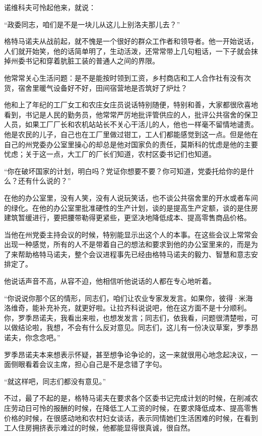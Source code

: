 诺维科夫可怜起他来，就说：

“政委同志，咱们是不是一块儿从这儿上别洛夫那儿去？”

格特马诺夫从战前起，就不愧是一个很好的群众工作者和领导者。他一开始说话，人们就开始笑，他的话简单明了，生动活泼，还常常带上几句粗话，一下子就会抹掉州委书记和穿着肮脏工装的普通人之间的界限。

他常常关心生活问题：是不是能按时领到工资，乡村商店和工人合作社有没有次货，宿舍里暖气设备好不好，田间宿营地是否筑好了炉灶？

他和上了年纪的工厂女工和农庄女庄员说话特别随便，特别和善，大家都很欣喜地看到，书记是人民的勤务员，他常常严厉地批评管供应的人，批评公共宿舍的保卫人员，如果工厂厂长和农机站站长不关心干活儿的人，他也一样毫不留情地谴责。他是农民的儿子，自己也在工厂里做过钳工，工人们都能感觉到这一点。但是他在自己的州党委办公室里操心的却总是他对国家负的责任，莫斯科的忧虑是他的主要忧虑；关于这一点，大工厂的厂长们知道，农村区委书记们也知道。

“你在破坏国家的计划，明白吗？党证你想要不要？你可知道，党委托给你的是什么？还有什么说的？”

在他的办公室里，没有人笑，没有人说玩笑话，也不谈公共宿舍里的开水或者车间的绿化。在他的办公室里批准硬性的生产计划，谈的是提高生产定额，谈的是住房建筑暂缓进行，要把腰带勒得更紧些，更坚决地降低成本、提高零售商品价格。

当他在州党委主持会议的时候，特别能显示出这个人的本事。在这些会议上常常会出现一种感觉，所有的人不是带着自己的想法和要求到他的办公室里来的，而是为了来帮助格特马诺夫，整个会议进程事先已经由格特马诺夫的毅力、智慧和意志安排定了。

他说话声音不高，从容不迫，他相信听他说话的人都在专心地听着。

“你说说你那个区的情形，同志们，咱们让农业专家发发言。如果你，彼得·米海洛维奇，能补充补充，就更好啦。让拉齐科说说吧，他在这方面不是十分顺利。你，罗季昂诺夫，我看出来啦，也想发发言；同志们，依我看，问题很清楚啦，可以做结论啦，我想，不会有什么反对意见。同志们，这儿有一份决议草案，罗季昂诺夫，你念念吧。”

罗季昂诺夫本来想表示怀疑，甚至想争论争论的，这一来就很用心地念起决议，一面侧眼看着会议主席，担心自己是不是念错了字句。

“就这样吧，同志们都没有意见。”

不过，最了不起的是，格特马诺夫在要求各个区委书记完成计划的时候，在削减农庄劳动日可怜的报酬的时候，在降低工人工资的时候，在要求降低成本、提高零售价格的时候，在很感动地和农村妇女谈话，表示同情她们生活困难的时候，在看到工人住房拥挤表示难过的时候，他都能显得很真诚，很自然。

